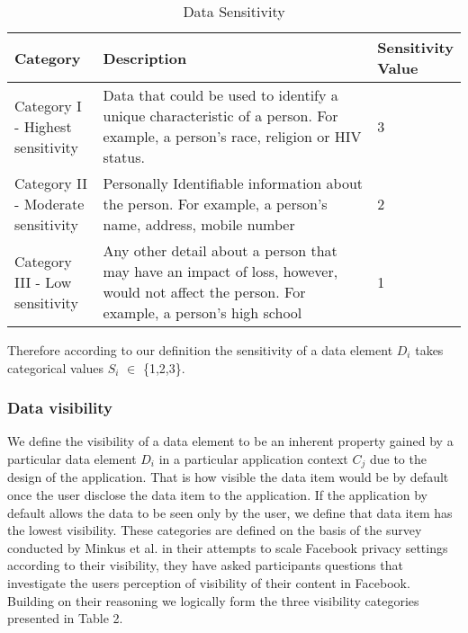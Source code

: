 \documentclass[10pt]{article}
\begin{document}
\begin{center}
\begin{table}[htbp]
\caption{Data Sensitivity}
\begin{center}
\begin{adjustbox}{width=0.5\textwidth} 
\begin{tabular}{|p{0.2\linewidth}|p{0.7\linewidth}|p{0.1\linewidth}|} 
\hline
Category & Description & Sensitivity Value \\
\hline
Category I - Highest sensitivity & Data that could be used to identify a unique characteristic of a person. For example, a person's race, religion or HIV status. & 3 \\
\hline
Category II - Moderate sensitivity & Personally Identifiable information about the person. For example, a person's name, address, mobile number & 2 \\
\hline
Category III - Low sensitivity & Any other detail about a person that may have an impact of loss, however, would not affect the person. For example, a person's high school & 1 \\
\hline
\end{tabular}
\end{adjustbox}
\end{center}
\end{table}
\end{center} 

Therefore according to our definition the sensitivity of a data element \textit {$D_i$} takes categorical values \textit {$S_i$} $\in$ \{1,2,3\}.

\subsubsection{Data visibility} 

We define the visibility of a data element to be an inherent property gained by a particular data element \textit{$D_i$} in a particular application context \textit{$C_j$} due to the design of the application. That is how visible the data item would be by default once the user disclose the data item to the application. If the application by default allows the data to be seen only by the user, we define that data item has the lowest visibility. These categories are defined on the basis of the survey conducted by Minkus et al. \cite{minkus2014scale} in their attempts to scale Facebook privacy settings according to their visibility, they have asked participants questions that investigate the users perception of visibility of their content in Facebook. Building on their reasoning we logically form the three visibility categories presented in Table 2.
\end{document}
